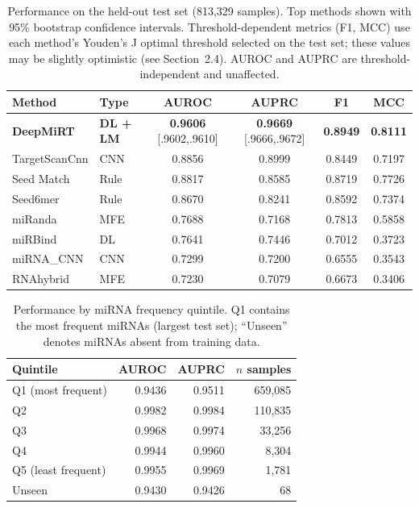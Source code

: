 \documentclass[10pt,a4paper]{article}
\begin{document}
\begin{table}[!htbp]
\centering
\caption{Performance on the held-out test set (813{,}329 samples). Top methods shown with 95\% bootstrap confidence intervals. Threshold-dependent metrics (F1, MCC) use each method's Youden's J optimal threshold selected on the test set; these values may be slightly optimistic (see Section~2.4). AUROC and AUPRC are threshold-independent and unaffected.}
\label{tab:testset}
\small
\begin{tabular}{llcccc}
\toprule
Method & Type & AUROC & AUPRC & F1 & MCC \\
\midrule
\textbf{DeepMiRT} & \textbf{DL + LM} & \textbf{0.9606} \scriptsize{[.9602,.9610]} & \textbf{0.9669} \scriptsize{[.9666,.9672]} & \textbf{0.8949} & \textbf{0.8111} \\
TargetScanCnn & CNN & 0.8856 & 0.8999 & 0.8449 & 0.7197 \\
Seed Match & Rule & 0.8817 & 0.8585 & 0.8719 & 0.7726 \\
Seed6mer & Rule & 0.8670 & 0.8241 & 0.8592 & 0.7374 \\
miRanda & MFE & 0.7688 & 0.7168 & 0.7813 & 0.5858 \\
miRBind & DL & 0.7641 & 0.7446 & 0.7012 & 0.3723 \\
miRNA\_CNN & CNN & 0.7299 & 0.7200 & 0.6555 & 0.3543 \\
RNAhybrid & MFE & 0.7230 & 0.7079 & 0.6673 & 0.3406 \\
\bottomrule
\end{tabular}
\end{table}

\begin{table}[!htbp]
\centering
\caption{Performance by miRNA frequency quintile. Q1 contains the most frequent miRNAs (largest test set); ``Unseen'' denotes miRNAs absent from training data.}
\label{tab:frequency}
\small
\begin{tabular}{lrrr}
\toprule
Quintile & AUROC & AUPRC & $n$ samples \\
\midrule
Q1 (most frequent) & 0.9436 & 0.9511 & 659{,}085 \\
Q2 & 0.9982 & 0.9984 & 110{,}835 \\
Q3 & 0.9968 & 0.9974 & 33{,}256 \\
Q4 & 0.9944 & 0.9960 & 8{,}304 \\
Q5 (least frequent) & 0.9955 & 0.9969 & 1{,}781 \\
Unseen & 0.9430 & 0.9426 & 68 \\
\bottomrule
\end{tabular}
\end{table}
\end{document}
